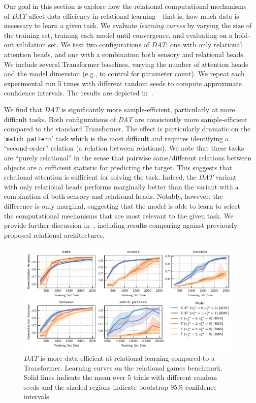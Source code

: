 Our goal in this section is explore how the relational computational mechanisms of \textit{DAT} affect data-efficiency in relational learning---that is, how much data is necessary to learn a given task. We evaluate \textit{learning curves} by varying the size of the training set, training each model until convergence, and evaluating on a hold-out validation set. We test two configurations of \textit{DAT}: one with only relational attention heads, and one with a combination both sensory and relational heads. We include several Transformer baselines, varying the number of attention heads and the model dimension (e.g., to control for parameter count). We repeat each experimental run 5 times with different random seeds to compute approximate confidence intervals. The results are depicted in~.

We find that \textit{DAT} is significantly more sample-efficient, particularly at more difficult tasks. Both configurations of \textit{DAT} are consistently more sample-efficient compared to the standard Transformer. The effect is particularly dramatic on the `\texttt{match pattern}' task which is the most difficult and requires identifying a ``second-order'' relation (a relation between relations). We note that these tasks are ``purely relational'' in the sense that pairwise same/different relations between objects are a sufficient statistic for predicting the target. This suggests that relational attention is sufficient for solving the task. Indeed, the \textit{DAT} variant with only relational heads performs marginally better than the variant with a combination of both sensory and relational heads. Notably, however, the difference is only marginal, suggesting that the model is able to learn to select the computational mechanisms that are most relevant to the given task. We provide further discussion in~, including results comparing against previously-proposed relational architectures.


\begin{figure}[ht]
    \includegraphics[width=\textwidth]{figs/experiments/relgames/relgames_learning_curves_transformer_comparison.pdf}
    \caption{\textit{DAT} is more data-efficient at relational learning compared to a Transformer. Learning curves on the relational games benchmark. Solid lines indicate the mean over 5 trials with different random seeds and the shaded regions indicate bootstrap 95\% confidence intervals.}\label{fig:relgames_learning_curves}
\end{figure}

